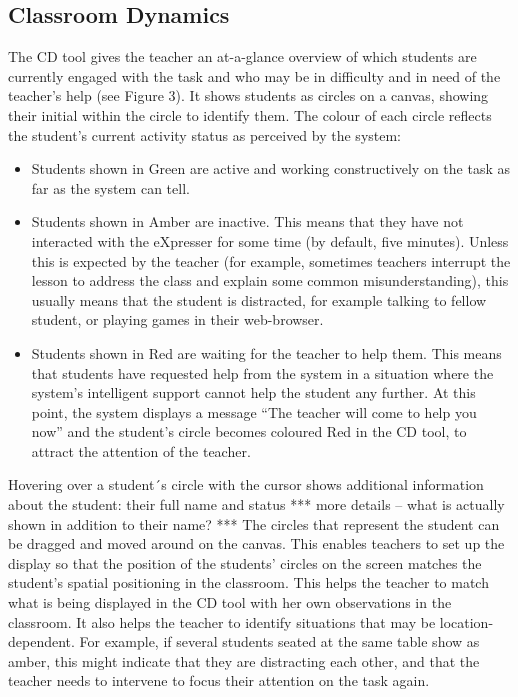 \subsection{Classroom Dynamics}
\label{sec:classroom-dynamics}


The CD tool gives the teacher an at-a-glance overview of which
students are currently engaged with the task and who may be in
difficulty and in need of the teacher's help (see Figure 3).  It shows
students as circles on a canvas, showing their initial within the
circle to identify them. The colour of each circle reflects the
student's current activity status as perceived by the system:

\begin{itemize}
\item Students shown in Green are active and working constructively on
  the task as far as the system can tell.
\item Students shown in Amber are inactive. This means that they have
  not interacted with the eXpresser for some time (by default, five
  minutes). Unless this is expected by the teacher (for example,
  sometimes teachers interrupt the lesson to address the class and
  explain some common misunderstanding), this usually means that the
  student is distracted, for example talking to fellow student, or
  playing games in their web-browser.
\item Students shown in Red are waiting for the teacher to help
  them. This means that students have requested help from the system
  in a situation where the system’s intelligent support cannot help
  the student any further. At this point, the system displays a
  message “The teacher will come to help you now” and the student’s
  circle becomes coloured Red in the CD tool, to attract the attention
  of the teacher.
\end{itemize}

Hovering over a student´s circle with the cursor shows additional
information about the student: their full name and status *** more
details – what is actually shown in addition to their name? *** The
circles that represent the student can be dragged and moved around on
the canvas. This enables teachers to set up the display so that the
position of the students’ circles on the screen matches the student’s
spatial positioning in the classroom. This helps the teacher to match
what is being displayed in the CD tool with her own observations in
the classroom. It also helps the teacher to identify situations that
may be location-dependent. For example, if several students seated at
the same table show as amber, this might indicate that they are
distracting each other, and that the teacher needs to intervene to
focus their attention on the task again.

